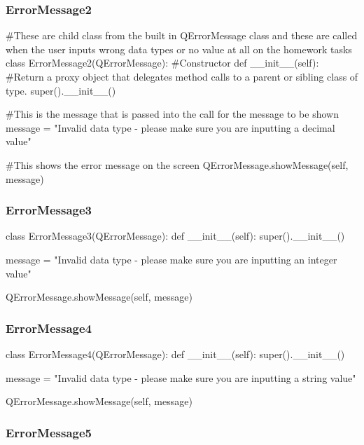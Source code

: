 \begin{landscape}
\subsubsection{ErrorMessage2}

\begin{python}
#These are child class from the built in QErrorMessage class and these are called when the user inputs wrong data types or no value at all on the homework tasks
class ErrorMessage2(QErrorMessage):
    #Constructor
    def __init__(self):
        #Return a proxy object that delegates method calls to a parent or sibling class of type.
        super().__init__()
        
        #This is the message that is passed into the call for the message to be shown
        message = "Invalid data type - please make sure you are inputting a decimal value"

        #This shows the error message on the screen
        QErrorMessage.showMessage(self, message)
\end{python}

\subsubsection{ErrorMessage3}

\begin{python}
class ErrorMessage3(QErrorMessage):
    def __init__(self):
        super().__init__()
        
        message = "Invalid data type - please make sure you are inputting an integer value"
        
        QErrorMessage.showMessage(self, message)
\end{python}

\subsubsection{ErrorMessage4}

\begin{python}
class ErrorMessage4(QErrorMessage):
    def __init__(self):
        super().__init__()
        
        message = "Invalid data type - please make sure you are inputting a string value"
        
        QErrorMessage.showMessage(self, message)
\end{python}

\subsubsection{ErrorMessage5}


\end{landscape}
